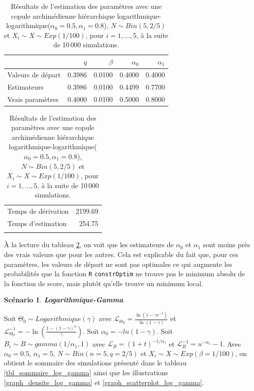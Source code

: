 \documentclass{article}
\newtheorem{Scenario}{Scénario}
\begin{document}
		\begin{table}[H]
			\centering
			\begin{tabular}{lrrrr}
				\hline
				& $q$ & $\beta$ & $\alpha_0$ & $\alpha_1$ \\ 
				\hline
				Valeurs de départ & 0.3986 & 0.0100 & 0.4000 & 0.4000 \\ 
				Estimateurs & 0.3986 & 0.0100 & 0.4499 & 0.7700 \\ 
				Vrais paramètres & 0.4000 & 0.0100 & 0.5000 & 0.8000 \\ 
				\hline
			\end{tabular}
			\begin{tabular}{lr}
				\hline
				&  \\ 
				\hline
				Temps de dérivation & 2199.69 \\ 
				Temps d'estimation & 254.75 \\ 
				\\
				\hline
			\end{tabular}
		\caption[Résultats du scénario \ref{scenario_log_log}]{Résultats de l'estimation des paramètres avec une copule archimédienne hiérarchique logarithmique-logarithmique($\alpha_0=0.5, \alpha_1=0.8$), $N \sim Bin(5, 2/5)$ et $X_i \sim X \sim Exp(1/100)$, pour $i=1,\dots, 5$, à la suite de 10\,000 simulations.}
		\label{tbl_resultats_log_log}
		\end{table}
	
		À la lecture du tableau \ref{tbl_resultats_log_log}, on voit que les estimateurs de $\alpha_0$ et $\alpha_1$ sont moins près des vrais valeurs que pour les autres. Cela est explicable du fait que, pour ces paramètres, les valeurs de départ ne sont pas optimales ce qui augmente les probabilités que la fonction \texttt{R} \texttt{constrOptim} ne trouve pas le minimum absolu de la fonction de score, mais plutôt qu'elle trouve un minimum local.
		
		\begin{Scenario}\label{scenario_log_gamma}
			\textbf{Logarithmique-Gamma}
		\end{Scenario}
	
		Soit $\Theta_0 \sim Logarithmique(\gamma)$ avec $\mathscr{L}_{\Theta_0} = \frac{\ln(1-\gamma e^{-t})}{\ln(1-\gamma)}$ et $\mathscr{L}^{-1}_{\Theta_0} = -\ln \left( \frac{1-(1-\gamma)^u}{\gamma} \right)$. Soit $\alpha_{0} = -ln(1-\gamma)$.
		Soit $B_i \sim B \sim gamma(1/\alpha_1,1)$ avec $\mathscr{L}_{B} = (1+t)^{-1/\alpha_1}$ et $\mathscr{L}^{-1}_{B} = u^{-\alpha_1} - 1$. Avec $\alpha_0 = 0.5$, $\alpha_1 = 5$, $N\sim Bin(n=5, q=2/5)$ et $X_i \sim X \sim Exp(\beta = 1/100)$, on obtient le sommaire des simulations présenté dans le tableau \ref{tbl_sommaire_log_gamma} ainsi que les illustrations \ref{graph_densite_log_gamma} et \ref{graph_scatterplot_log_gamma}.
		
\end{document}

